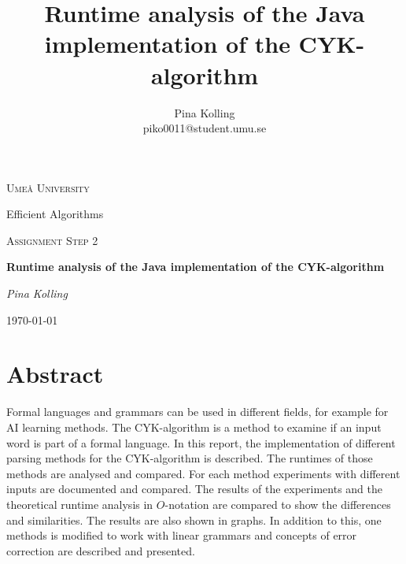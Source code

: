 \documentclass[a4paper, 11pt]{article}
\title{Runtime analysis of the Java implementation of the CYK-algorithm}
\author{Pina Kolling \\ piko0011@student.umu.se}
\begin{document}
\begin{titlepage}
	\centering
	{\scshape\LARGE Ume\r{a} University \par}
	Efficient Algorithms \par
	\vspace{1cm}
	{\scshape\Large Assignment Step 2 \par }
	\vspace{1.5cm}
	{\huge\bfseries  Runtime analysis of the Java implementation of the CYK-algorithm \par}
	\vspace{2cm}
	{\Large\itshape Pina Kolling\par}
	\vfill

	{\large \today\par}
\end{titlepage}











\section*{Abstract}

Formal languages and grammars can be used in different fields, for example for AI learning methods. The CYK-algorithm is a method to examine if an input word is part of a formal language. 
In this report, the implementation of different parsing methods for the CYK-algorithm is described. The runtimes of those methods are analysed and compared. For each method experiments with different inputs are documented and compared. The results of the experiments and the theoretical runtime analysis in $O$-notation are compared to show the differences and similarities. The results are also shown in graphs.
In addition to this, one methods is modified to work with linear grammars and concepts of error correction are described and presented.















\setcounter{page}{1}
\end{document}
